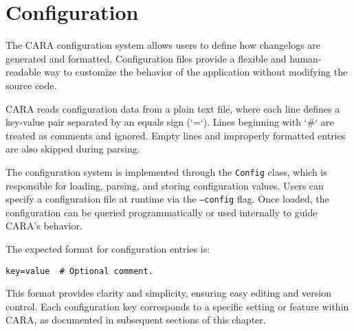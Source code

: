 \chapter{Configuration}
\label{ch:configuration}
\pagestyle{fancy}

The CARA configuration system allows users to define how changelogs are generated and formatted. Configuration files provide a flexible and human-readable way to customize the behavior of the application without modifying the source code.

CARA reads configuration data from a plain text file, where each line defines a key-value pair separated by an equals sign (`=`). Lines beginning with `\#` are treated as comments and ignored. Empty lines and improperly formatted entries are also skipped during parsing.

The configuration system is implemented through the \texttt{Config} class, which is responsible for loading, parsing, and storing configuration values. Users can specify a configuration file at runtime via the \texttt{--config} flag. Once loaded, the configuration can be queried programmatically or used internally to guide CARA’s behavior.

The expected format for configuration entries is:

\begin{lstlisting}[style=cppstyle]
key=value  # Optional comment.
\end{lstlisting}

This format provides clarity and simplicity, ensuring easy editing and version control. Each configuration key corresponds to a specific setting or feature within CARA, as documented in subsequent sections of this chapter.